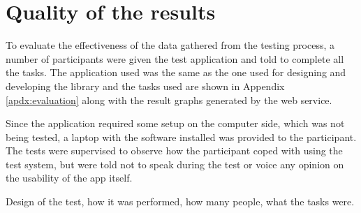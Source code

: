 \section{Quality of the results}

To evaluate the effectiveness of the data gathered from the testing process, a number of participants were given the test application and told to complete all the tasks. The application used was the same as the one used for designing and developing the library and the tasks used are shown in Appendix \ref{apdx:evaluation} along with the result graphs generated by the web service.

Since the application required some setup on the computer side, which was not being tested, a laptop with the software installed was provided to the participant. The tests were supervised to observe how the participant coped with using the test system, but were told not to speak during the test or voice any opinion on the usability of the app itself.

Design of the test, 
how it was performed, 
how many people, 
what the tasks were.


